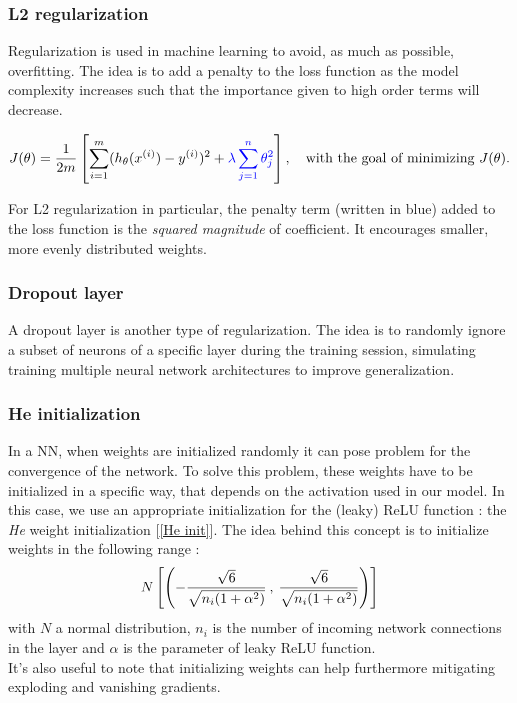 \documentclass [12pt] {article}
\numberwithin{equation}{section} %
\numberwithin{figure}{section}   %
\newcommand{\HHquad}{\hspace{0.2em}}
\begin{document}
\subsubsection*{L2 regularization}

Regularization is used in machine learning to avoid, as much as possible, overfitting. The idea is to add a penalty to the loss function as the model complexity increases such that the importance given to high order terms will decrease.

\begin{equation}
    J(\theta) = \frac{1}{2m} \left[ \sum^{m}_{i=1} (h_\theta (x^{(i)}) - y^{(i)})^2 + \textcolor{blue}{\lambda \sum^n_{j=1} \theta^2_j} \right], \quad \text{with the goal of minimizing } J(\theta).
    \label{regu}
\end{equation}

For L2 regularization in particular, the penalty term (written in blue) added to the loss function is the \textit{squared magnitude} of coefficient. It encourages smaller, more evenly distributed weights.



\subsubsection*{Dropout layer}

A dropout layer is another type of regularization. The idea is to randomly ignore a subset of neurons of a specific layer during the training session, simulating training multiple neural network architectures to improve generalization.

\subsubsection*{He initialization}

In a NN, when weights are initialized randomly it can pose problem for the convergence of the network. To solve this problem, these weights have to be initialized in a specific way, that depends on the activation used in our model. In this case, we use an appropriate initialization for the (leaky) ReLU function : the \textit{He} weight initialization [\ref{He init}]. The idea behind this concept is to initialize weights in the following range : 
\begin{equation}
    N \left[ \left(-\frac{\sqrt{6}}{\sqrt{n_i(1+\alpha^2)}} \HHquad , \HHquad \frac{\sqrt{6}}{\sqrt{n_i(1+\alpha^2)}}  \right)\right]
\end{equation}
with $N$ a normal distribution, $n_i$ is the number of incoming network connections in the layer and $\alpha$ is the parameter of leaky ReLU function.\\
It's also useful to note that initializing weights can help furthermore mitigating exploding and vanishing gradients. 
\end{document}
